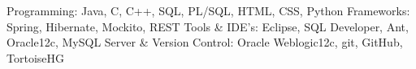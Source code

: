 \begin{cvskills}
  \cvskill
    {Programming:}
    {Java, C, C++, SQL, PL/SQL, HTML, CSS, Python}
  \cvskill
    {Frameworks:}
    {Spring, Hibernate, Mockito, REST}
  \cvskill
    {Tools \& IDE's:}
    {Eclipse, SQL Developer, Ant, Oracle12c, MySQL}
  \cvskill
    {Server \& Version Control:}
    {Oracle Weblogic12c, git, GitHub, TortoiseHG}
\end{cvskills}